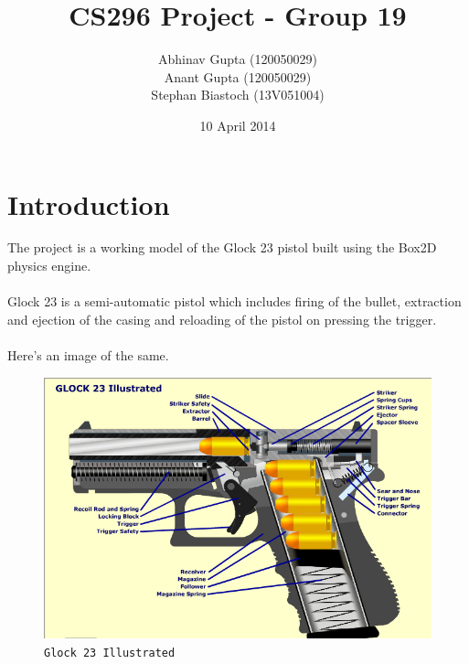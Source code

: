 \documentclass{article}
\title{\Huge{CS296 Project - Group 19\\}}
\author{\Large{Abhinav Gupta} (120050029)\\\Large{Anant Gupta} (120050029)\\\Large{Stephan Biastoch} (13V051004)\\ }
\date{\Large{10 April 2014}}
\begin{document}
\maketitle
\pagebreak
\section{Introduction}
The project is a working model of the Glock 23 pistol built using the Box2D\cite{box2d} physics engine.
\\
\\
Glock 23 is a semi-automatic pistol which includes firing of the bullet, extraction and ejection of the casing and reloading of the pistol on pressing the trigger.
\\
\\
Here's an image of the same\cite{genitron}.
\\
\begin{figure}[hbtp]
\centering
\includegraphics[scale=0.3]{glock.png}
\caption{\texttt{Glock 23 Illustrated}}
\end{figure}
\pagebreak
\end{document}
